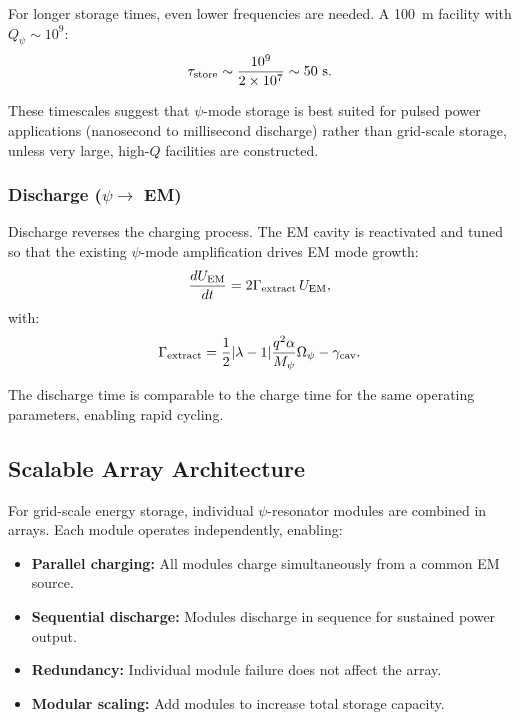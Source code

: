 \documentclass[aps,prd,twocolumn,showpacs,preprintnumbers,superscriptaddress,nofootinbib]{revtex4-2}
\begin{document}
For longer storage times, even lower frequencies are needed.  A
100~m facility with $Q_\psi \sim 10^9$:
\begin{equation}
\tau_{\rm store} \sim \frac{10^9}{2\times 10^7} \sim 50~\text{s}.
\end{equation}

These timescales suggest that $\psi$-mode storage is best suited for
pulsed power applications (nanosecond to millisecond discharge) rather
than grid-scale storage, unless very large, high-$Q$ facilities are
constructed.

\subsubsection{Discharge ($\psi \to$ EM)}

Discharge reverses the charging process.  The EM cavity is reactivated
and tuned so that the existing $\psi$-mode amplification drives EM
mode growth:
\begin{equation}
\frac{dU_{\rm EM}}{dt} = 2\Gamma_{\rm extract}\,U_{\rm EM},
\end{equation}
with:
\begin{equation}
\Gamma_{\rm extract} = \frac{1}{2}|\lambda-1|\frac{q^2\alpha}{M_\psi}\Omega_\psi - \gamma_{\rm cav}.
\end{equation}

The discharge time is comparable to the charge time for the same
operating parameters, enabling rapid cycling.

\subsection{Scalable Array Architecture}\label{sec:array}

For grid-scale energy storage, individual $\psi$-resonator modules are
combined in arrays.  Each module operates independently, enabling:

\begin{itemize}
\item \textbf{Parallel charging:} All modules charge simultaneously from
a common EM source.
\item \textbf{Sequential discharge:} Modules discharge in sequence for
sustained power output.
\item \textbf{Redundancy:} Individual module failure does not affect the
array.
\item \textbf{Modular scaling:} Add modules to increase total storage
capacity.
\end{itemize}
\end{document}
